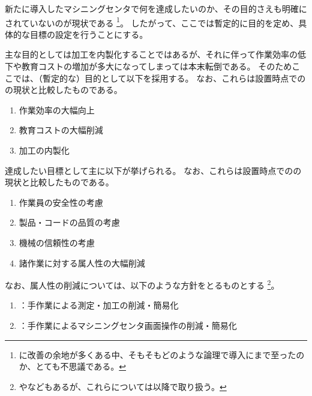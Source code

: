 

新たに導入したマシニングセンタで何を達成したいのか、その目的さえも明確にされていないのが現状である
\footnote{\MMC に改善の余地が多くある中、そもそもどのような論理で導入にまで至ったのか、とても不思議である。}。
したがって、ここでは暫定的に目的を定め、具体的な目標の設定を行うことにする。



主な目的としては\Dimple 加工を内製化することではあるが、それに伴って作業効率の低下や教育コストの増加が多大になってしまっては本末転倒である。
そのためここでは、（暫定的な）目的として以下を採用する。
なお、これらは\DMC 設置時点での\MMC の現状と比較したものである。
\begin{enumerate}[label=\sarrow]
\item 作業効率の大幅向上
\item 教育コストの大幅削減
\item \Dimple 加工の内製化
\end{enumerate}



達成したい目標として主に以下が挙げられる。
なお、これらは\DMC 設置時点での\MMC の現状と比較したものである。
\begin{enumerate}[label=\sarrow]
\item 作業員の安全性の考慮
\item 製品・コードの品質の考慮
\item 機械の信頼性の考慮
\item 諸作業に対する属人性の大幅削減
\end{enumerate}
なお、属人性の削減については、以下のような方針をとるものとする
\footnote{やなどもあるが、これらについては以降で取り扱う。}。
\begin{enumerate}[label=\sarrow]
\item {}：手作業による測定・加工の削減・簡易化
\item {}：手作業によるマシニングセンタ画面操作の削減・簡易化
\end{enumerate}


